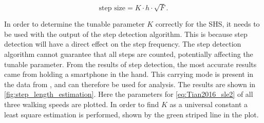 \begin{equation}
\label{eq:Tian2016_sle2}
\text{step size} = K \cdot h \cdot \sqrt{F}.
\end{equation}

In order to determine the tunable parameter $K$ correctly for the SHS, it needs to be used with the output of the step detection algorithm. This is because step detection will have a direct effect on the step frequency. The step detection algorithm cannot guarantee that all steps are counted, potentially affecting the tunable parameter. 
From the results of step detection, the most accurate results came from holding a smartphone in the hand. This carrying mode is present in the data from \cite{Vezocnik2019}, and can therefore be used for analysis. The results are shown in \cref{fig:step_length_estimation}. Here the parameters for \cref{eq:Tian2016_sle2} of all three walking speeds are plotted. In order to find $K$ as a universal constant a least square estimation is performed, shown by the green striped line in the plot.
